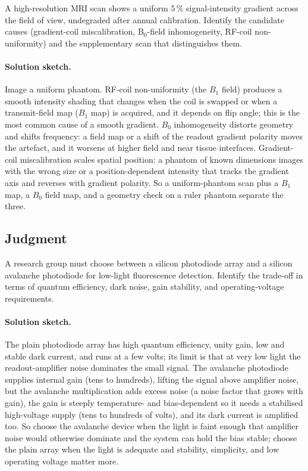 \begin{exercise}
A high-resolution MRI scan shows a uniform $5\,\%$ signal-intensity
gradient across the field of view, undegraded after annual
calibration. Identify the candidate causes (gradient-coil
miscalibration, B$_{0}$-field inhomogeneity, RF-coil non-uniformity)
and the supplementary scan that distinguishes them.
\paragraph{Solution sketch.} Image a uniform phantom. RF-coil
non-uniformity (the $B_{1}$ field) produces a smooth intensity shading
that changes when the coil is swapped or when a transmit-field map
($B_{1}$ map) is acquired, and it depends on flip angle; this is the
most common cause of a smooth gradient. $B_{0}$ inhomogeneity distorts
geometry and shifts frequency: a field map or a shift of the readout
gradient polarity moves the artefact, and it worsens at higher field and
near tissue interfaces. Gradient-coil miscalibration scales spatial
position: a phantom of known dimensions images with the wrong size or a
position-dependent intensity that tracks the gradient axis and reverses
with gradient polarity. So a uniform-phantom scan plus a $B_{1}$ map, a
$B_{0}$ field map, and a geometry check on a ruler phantom separate the
three.
\end{exercise}

\subsection*{Judgment}

\begin{exercise}
A research group must choose between a silicon photodiode array and
a silicon avalanche photodiode for low-light fluorescence detection.
Identify the trade-off in terms of quantum efficiency, dark noise,
gain stability, and operating-voltage requirements.
\paragraph{Solution sketch.} The plain photodiode array has high
quantum efficiency, unity gain, low and stable dark current, and runs at
a few volts; its limit is that at very low light the readout-amplifier
noise dominates the small signal. The avalanche photodiode supplies
internal gain (tens to hundreds), lifting the signal above amplifier
noise, but the avalanche multiplication adds excess noise (a noise
factor that grows with gain), the gain is steeply temperature- and
bias-dependent so it needs a stabilised high-voltage supply (tens to
hundreds of volts), and its dark current is amplified too. So choose the
avalanche device when the light is faint enough that amplifier noise
would otherwise dominate and the system can hold the bias stable;
choose the plain array when the light is adequate and stability,
simplicity, and low operating voltage matter more.
\end{exercise}

